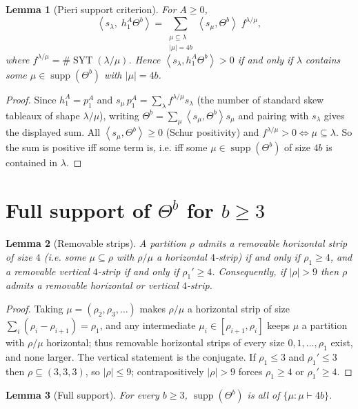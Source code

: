 \documentclass[11pt]{article}
\newtheorem{lemma}{Lemma}
\theoremstyle{definition}
\theoremstyle{remark}
\DeclareMathOperator{\SYT}{SYT}
\DeclareMathOperator{\supp}{supp}
\newcommand{\la}{\lambda}
\newcommand{\inner}[1]{\left\langle #1 \right\rangle}
\begin{document}
\begin{lemma}[Pieri support criterion]\label{lem:pieri}
For $A\ge0$,
\[
  \inner{s_\la,\;h_1^{A}\Theta^{b}}=\sum_{\substack{\mu\subseteq\la\\ |\mu|=4b}}
       \inner{s_\mu,\Theta^{b}}\; f^{\la/\mu},
\]
where $f^{\la/\mu}=\#\SYT(\la/\mu)$. Hence $\inner{s_\la,h_1^{A}\Theta^{b}}>0$ if and only
if $\la$ contains some $\mu\in\supp(\Theta^{b})$ with $|\mu|=4b$.
\end{lemma}

\begin{proof}
Since $h_1^{A}=p_1^{A}$ and $s_\mu\,p_1^{A}=\sum_\la f^{\la/\mu}s_\la$ (the number of
standard skew tableaux of shape $\la/\mu$), writing
$\Theta^{b}=\sum_\mu\inner{s_\mu,\Theta^{b}}s_\mu$ and pairing with $s_\la$ gives the
displayed sum. All $\inner{s_\mu,\Theta^{b}}\ge0$ (Schur positivity) and
$f^{\la/\mu}>0\iff\mu\subseteq\la$. So the sum is positive iff some term is, i.e. iff
some $\mu\in\supp(\Theta^{b})$ of size $4b$ is contained in $\la$.
\end{proof}

\section{Full support of $\Theta^{b}$ for $b\ge3$}

\begin{lemma}[Removable strips]\label{lem:strip}
A partition $\rho$ admits a removable horizontal strip of size $4$ (i.e. some
$\mu\subseteq\rho$ with $\rho/\mu$ a horizontal $4$-strip) if and only if $\rho_1\ge4$,
and a removable vertical $4$-strip if and only if $\rho_1'\ge4$. Consequently, if
$|\rho|>9$ then $\rho$ admits a removable horizontal or vertical $4$-strip.
\end{lemma}

\begin{proof}
Taking $\mu=(\rho_2,\rho_3,\dots)$ makes $\rho/\mu$ a horizontal strip of size
$\sum_i(\rho_i-\rho_{i+1})=\rho_1$, and any intermediate $\mu_i\in[\rho_{i+1},\rho_i]$
keeps $\mu$ a partition with $\rho/\mu$ horizontal; thus removable horizontal strips of
every size $0,1,\dots,\rho_1$ exist, and none larger. The vertical statement is the
conjugate. If $\rho_1\le3$ and $\rho_1'\le3$ then $\rho\subseteq(3,3,3)$, so
$|\rho|\le9$; contrapositively $|\rho|>9$ forces $\rho_1\ge4$ or $\rho_1'\ge4$.
\end{proof}

\begin{lemma}[Full support]\label{lem:full}
For every $b\ge3$, $\supp(\Theta^{b})$ is all of $\{\mu:\mu\vdash 4b\}$.
\end{lemma}
\end{document}
